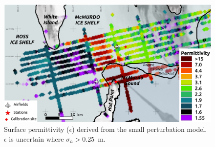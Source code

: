 \documentclass[agums,grl]{agutexSI}
\begin{document}
 
  \begin{figure}
 \noindent\includegraphics[width=\textwidth]{figS6}
\caption{Surface permittivity ($\epsilon$) derived from the small perturbation model. $\epsilon$ is uncertain where $\sigma_h > $0.25~m.}
 \label{permittivity}
 \end{figure}


%
%

%
\end{document}
